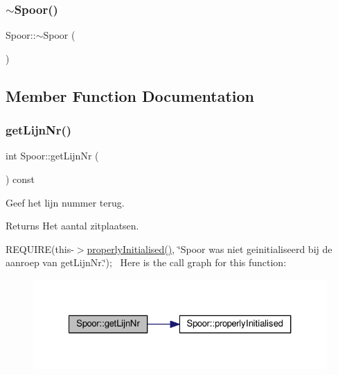 \subsubsection{\texorpdfstring{$\sim$\+Spoor()}{~Spoor()}}
{\footnotesize\ttfamily Spoor\+::$\sim$\+Spoor (\begin{DoxyParamCaption}{ }\end{DoxyParamCaption})\hspace{0.3cm}{\ttfamily [virtual]}}



\subsection{Member Function Documentation}
\mbox{\label{class_spoor_a66ebc0abcb370b1509bd7b3961a8e45a}} 
\subsubsection{\texorpdfstring{get\+Lijn\+Nr()}{getLijnNr()}}
{\footnotesize\ttfamily int Spoor\+::get\+Lijn\+Nr (\begin{DoxyParamCaption}{ }\end{DoxyParamCaption}) const}



Geef het lijn nummer terug. 

\begin{DoxyReturn}{Returns}
Het aantal zitplaatsen.
\end{DoxyReturn}
R\+E\+Q\+U\+I\+RE(this-\/$>$\hyperlink{class_spoor_a1eb7c54228676cdb7c8620104e063a3c}{properly\+Initialised()}, \char`\"{}\+Spoor was niet geinitialiseerd bij de aanroep van get\+Lijn\+Nr.\char`\"{});~\newline
Here is the call graph for this function\+:
\nopagebreak
\begin{figure}[H]
\begin{center}
\leavevmode
\includegraphics[width=327pt]{class_spoor_a66ebc0abcb370b1509bd7b3961a8e45a_cgraph}
\end{center}
\end{figure}
\mbox{\label{class_spoor_a1eb7c54228676cdb7c8620104e063a3c}} 
